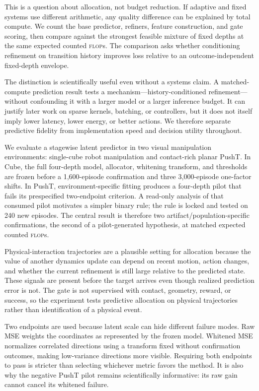 \documentclass{article}
\newcommand{\flops}{\textsc{flop}s}
\begin{document}
This is a question about allocation, not budget reduction. If adaptive and fixed systems use different arithmetic, any quality difference can be explained by total compute. We count the base predictor, refiners, feature construction, and gate scoring, then compare against the strongest feasible mixture of fixed depths at the same expected counted \flops{}. The comparison asks whether conditioning refinement on transition history improves loss relative to an outcome-independent fixed-depth envelope.

The distinction is scientifically useful even without a systems claim. A matched-compute prediction result tests a mechanism---history-conditioned refinement---without confounding it with a larger model or a larger inference budget. It can justify later work on sparse kernels, batching, or controllers, but it does not itself imply lower latency, lower energy, or better actions. We therefore separate predictive fidelity from implementation speed and decision utility throughout.

We evaluate a stagewise latent predictor in two visual manipulation environments: single-cube robot manipulation and contact-rich planar PushT. In Cube, the full four-depth model, allocator, whitening transform, and thresholds are frozen before a 1,600-episode confirmation and three 3,000-episode one-factor shifts. In PushT, environment-specific fitting produces a four-depth pilot that fails its prespecified two-endpoint criterion. A read-only analysis of that consumed pilot motivates a simpler binary rule; the rule is locked and tested on 240 new episodes. The central result is therefore two artifact/population-specific confirmations, the second of a pilot-generated hypothesis, at matched expected counted \flops{}.

Physical-interaction trajectories are a plausible setting for allocation because the value of another dynamics update can depend on recent motion, action changes, and whether the current refinement is still large relative to the predicted state. These signals are present before the target arrives even though realized prediction error is not. The gate is not supervised with contact, geometry, reward, or success, so the experiment tests predictive allocation on physical trajectories rather than identification of a physical event.

Two endpoints are used because latent scale can hide different failure modes. Raw MSE weights the coordinates as represented by the frozen model. Whitened MSE normalizes correlated directions using a transform fixed without confirmation outcomes, making low-variance directions more visible. Requiring both endpoints to pass is stricter than selecting whichever metric favors the method. It is also why the negative PushT pilot remains scientifically informative: its raw gain cannot cancel its whitened failure.
\end{document}
